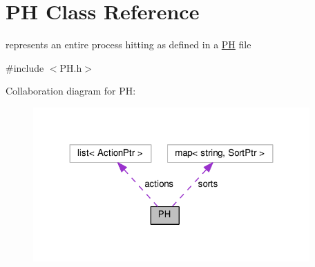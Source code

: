 \hypertarget{classPH}{\section{P\+H Class Reference}
\label{classPH}
}


represents an entire process hitting as defined in a \hyperlink{classPH}{P\+H} file  




{\ttfamily \#include $<$P\+H.\+h$>$}



Collaboration diagram for P\+H\+:\nopagebreak
\begin{figure}[H]
\begin{center}
\leavevmode
\includegraphics[width=300pt]{classPH__coll__graph}
\end{center}
\end{figure}
